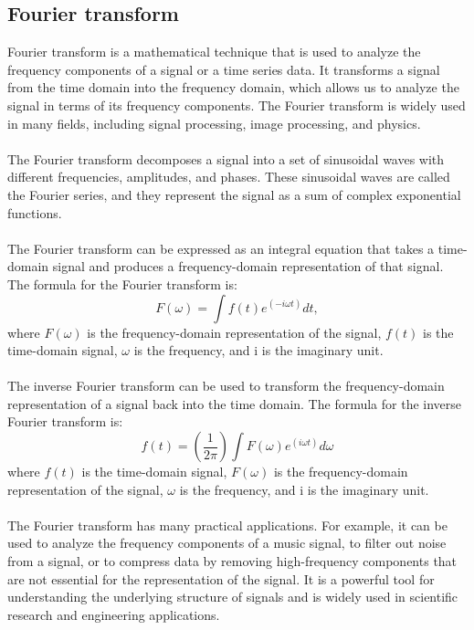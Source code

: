 \subsection{Fourier transform}
Fourier transform is a mathematical technique that is used to analyze the frequency components of a signal or a time
series data. It transforms a signal from the time domain into the frequency domain, which allows us to analyze the
signal in terms of its frequency components. The Fourier transform is widely used in many fields, including signal
processing, image processing, and physics.\\
\\
The Fourier transform decomposes a signal into a set of sinusoidal waves with different frequencies, amplitudes, and phases.
These sinusoidal waves are called the Fourier series, and they represent the signal as a sum of complex exponential functions.\\
\\
The Fourier transform can be expressed as an integral equation that takes a time-domain signal and
produces a frequency-domain representation of that signal. The formula for the Fourier transform is:\\
\begin{equation}
    F(\omega) = \int f(t) e^{(-i \omega t)} dt,
\end{equation}
where $F(\omega)$ is the frequency-domain representation of the signal, $f(t)$ is the time-domain signal, $\omega$ is the
frequency, and i is the imaginary unit.\\
\\
The inverse Fourier transform can be used to transform the frequency-domain representation of a signal back into the
time domain. The formula for the inverse Fourier transform is:
\begin{equation}
    f(t) = (\frac{1}{2\pi}) \int F(\omega) e^{(i \omega t)} d\omega
\end{equation}
where $f(t)$ is the time-domain signal, $F(\omega)$ is the frequency-domain representation of the signal, $\omega$ is the
frequency, and i is the imaginary unit.\\
\\
The Fourier transform has many practical applications. For example, it can be used to analyze the frequency components
of a music signal, to filter out noise from a signal, or to compress data by removing high-frequency components that
are not essential for the representation of the signal.  It is a powerful tool for understanding the underlying
structure of signals and is widely used in scientific research and engineering applications.

